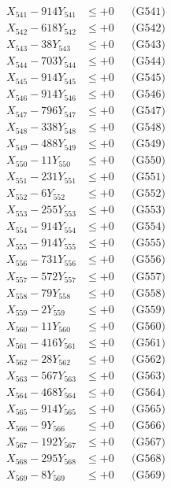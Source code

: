 \documentclass[a4paper,10pt]{article}
\begin{document}
{\begin{align}
\allowbreak
X_{541} - 914Y_{541} &\leq +0 && \text{(G541)} \\
X_{542} - 618Y_{542} &\leq +0 && \text{(G542)} \\
X_{543} - 38Y_{543} &\leq +0 && \text{(G543)} \\
X_{544} - 703Y_{544} &\leq +0 && \text{(G544)} \\
X_{545} - 914Y_{545} &\leq +0 && \text{(G545)} \\
X_{546} - 914Y_{546} &\leq +0 && \text{(G546)} \\
X_{547} - 796Y_{547} &\leq +0 && \text{(G547)} \\
X_{548} - 338Y_{548} &\leq +0 && \text{(G548)} \\
X_{549} - 488Y_{549} &\leq +0 && \text{(G549)} \\
X_{550} - 11Y_{550} &\leq +0 && \text{(G550)} \\
\allowbreak
X_{551} - 231Y_{551} &\leq +0 && \text{(G551)} \\
X_{552} - 6Y_{552} &\leq +0 && \text{(G552)} \\
X_{553} - 255Y_{553} &\leq +0 && \text{(G553)} \\
X_{554} - 914Y_{554} &\leq +0 && \text{(G554)} \\
X_{555} - 914Y_{555} &\leq +0 && \text{(G555)} \\
X_{556} - 731Y_{556} &\leq +0 && \text{(G556)} \\
X_{557} - 572Y_{557} &\leq +0 && \text{(G557)} \\
X_{558} - 79Y_{558} &\leq +0 && \text{(G558)} \\
X_{559} - 2Y_{559} &\leq +0 && \text{(G559)} \\
X_{560} - 11Y_{560} &\leq +0 && \text{(G560)} \\
\allowbreak
X_{561} - 416Y_{561} &\leq +0 && \text{(G561)} \\
X_{562} - 28Y_{562} &\leq +0 && \text{(G562)} \\
X_{563} - 567Y_{563} &\leq +0 && \text{(G563)} \\
X_{564} - 468Y_{564} &\leq +0 && \text{(G564)} \\
X_{565} - 914Y_{565} &\leq +0 && \text{(G565)} \\
X_{566} - 9Y_{566} &\leq +0 && \text{(G566)} \\
X_{567} - 192Y_{567} &\leq +0 && \text{(G567)} \\
X_{568} - 295Y_{568} &\leq +0 && \text{(G568)} \\
X_{569} - 8Y_{569} &\leq +0 && \text{(G569)} \\

\end{align}}
\end{document}
